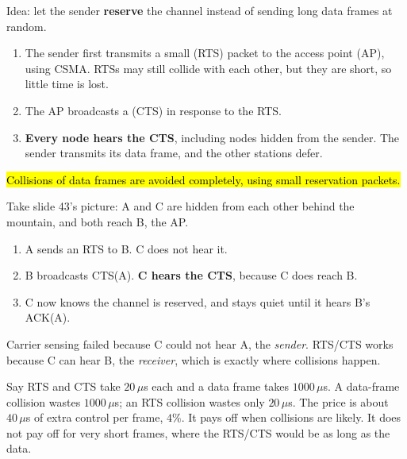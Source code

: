 \begin{defn}
Idea: let the sender \textbf{reserve} the channel instead of sending long data frames at random.
\begin{enumerate}
  \item The sender first transmits a small  (RTS) packet to the access point (AP), using CSMA. RTSs may still collide with each other, but they are short, so little time is lost.
  \item The AP broadcasts a  (CTS) in response to the RTS.
  \item \textbf{Every node hears the CTS}, including nodes hidden from the sender. The sender transmits its data frame, and the other stations defer.
\end{enumerate}
\hl{Collisions of data frames are avoided completely, using small reservation packets.}
\end{defn}


\begin{example}
Take slide 43's picture: A and C are hidden from each other behind the mountain, and both reach B, the AP.
\begin{enumerate}
  \item A sends an RTS to B. C does not hear it.
  \item B broadcasts CTS(A). \textbf{C hears the CTS}, because C does reach B.
  \item C now knows the channel is reserved, and stays quiet until it hears B's ACK(A).
\end{enumerate}
Carrier sensing failed because C could not hear A, the \emph{sender}. RTS/CTS works because C can hear B, the \emph{receiver}, which is exactly where collisions happen.
\end{example}

\begin{example}
Say RTS and CTS take $20\,\mu$s each and a data frame takes $1000\,\mu$s. A data-frame collision wastes $1000\,\mu$s; an RTS collision wastes only $20\,\mu$s.
The price is about $40\,\mu$s of extra control per frame, $4\%$. It pays off when collisions are likely. It does not pay off for very short frames, where the RTS/CTS would be as long as the data.
\end{example}

